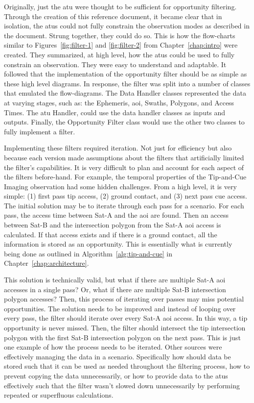 Originally, just the \gls{atu} were thought to be sufficient for opportunity
filtering. Through the creation of this reference document, it became clear
that in isolation, the \glspl{atu} could not fully constrain the observation
modes as described in the document. Strung together, they could do so.  This is
how the flow-charts similar to Figures~\ref{fig:filter-1} and
\ref{fig:filter-2} from Chapter~\ref{chap:intro} were created. They summarized,
at high level, how the \glspl{atu} could be used to fully constrain an
observation. They were easy to understand and adaptable. It followed that the
implementation of the opportunity filter should be as simple as these high
level diagrams. In response, the filter was split into a number of classes that
emulated the flow-diagrams. The Data Handler classes represented the data at
varying stages, such as: the Ephemeris, \gls{aoi}, Swaths, Polygons, and Access
Times. The \gls{atu} Handler, could use the data handler classes as inputs and
outputs. Finally, the Opportunity Filter class would use the other two classes
to fully implement a filter.  

Implementing these filters required iteration. Not just for efficiency but also
because each version made assumptions about the filters that artificially
limited the filter's capabilities.  It is very difficult to plan and account
for each aspect of the filters before-hand.  For example, the temporal
properties of the Tip-and-Cue Imaging observation had some hidden challenges.
From a high level, it is very simple: (1) first pass tip access, (2) ground
contact, and (3) next pass cue access. The initial solution may be to iterate
through each pass for a scenario. For each pass, the access time between Sat-A
and the \gls{aoi} are found. Then an access between Sat-B and the intersection
polygon from the Sat-A \gls{aoi} access is calculated. If that access exists
and if there is a ground contact, all the information is stored as an
opportunity.  This is essentially what is currently being done as outlined in
Algorithm~\ref{alg:tip-and-cue} in Chapter~\ref{chap:architecture}.  

This solution is technically valid, but what if there are multiple Sat-A
\gls{aoi} accesses in a single pass? Or, what if there are multiple Sat-B
intersection polygon accesses? Then, this process of iterating over passes may
miss potential opportunities. The solution needs to be improved and instead of
looping over every pass, the filter should iterate over every Sat-A \gls{aoi}
access.  In this way, a tip opportunity is never missed. Then, the filter
should intersect the tip intersection polygon with the first Sat-B intersection
polygon on the next pass.  This is just one example of how the process needs to
be iterated.  Other sources were effectively managing the data in a scenario.
Specifically how should data be stored such that it can be used as needed
throughout the filtering process, how to prevent copying the data
unnecessarily, or how to provide data to the \glspl{atu} effectively such that
the filter wasn't slowed down unnecessarily by performing repeated or
superfluous calculations.  


